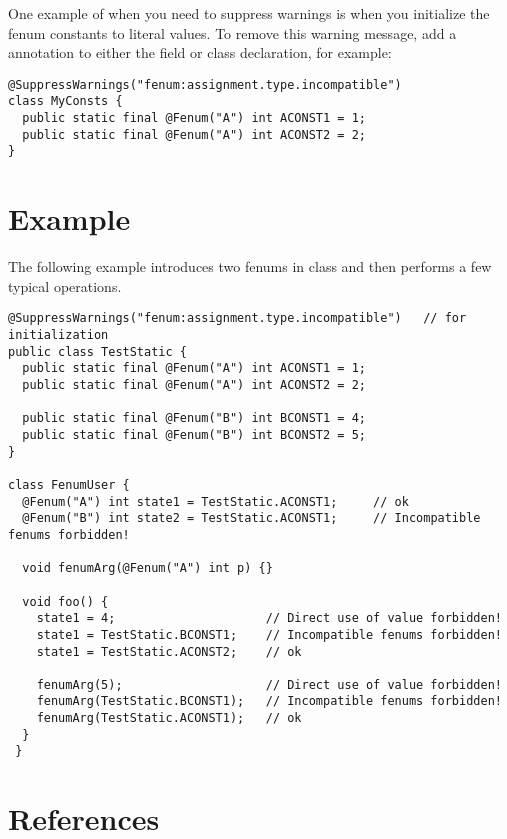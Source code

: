 One example of when you need to suppress warnings is when you initialize the
fenum constants to literal values.
To remove this warning message, add a  annotation to either
the field or class declaration, for example:

\begin{Verbatim}
@SuppressWarnings("fenum:assignment.type.incompatible")
class MyConsts {
  public static final @Fenum("A") int ACONST1 = 1;
  public static final @Fenum("A") int ACONST2 = 2;  
}
\end{Verbatim}



\section{Example\label{fenum-example}}

The following example introduces two fenums in class 
and then performs a few typical operations.

\begin{Verbatim}
@SuppressWarnings("fenum:assignment.type.incompatible")   // for initialization
public class TestStatic {
  public static final @Fenum("A") int ACONST1 = 1;
  public static final @Fenum("A") int ACONST2 = 2;

  public static final @Fenum("B") int BCONST1 = 4;
  public static final @Fenum("B") int BCONST2 = 5;
}

class FenumUser {
  @Fenum("A") int state1 = TestStatic.ACONST1;     // ok
  @Fenum("B") int state2 = TestStatic.ACONST1;     // Incompatible fenums forbidden!

  void fenumArg(@Fenum("A") int p) {}
	
  void foo() {
    state1 = 4;                     // Direct use of value forbidden!
    state1 = TestStatic.BCONST1;    // Incompatible fenums forbidden!
    state1 = TestStatic.ACONST2;    // ok

    fenumArg(5);                    // Direct use of value forbidden!
    fenumArg(TestStatic.BCONST1);   // Incompatible fenums forbidden!
    fenumArg(TestStatic.ACONST1);   // ok
  }
 }
\end{Verbatim}


\section{References\label{fenum-references}}

